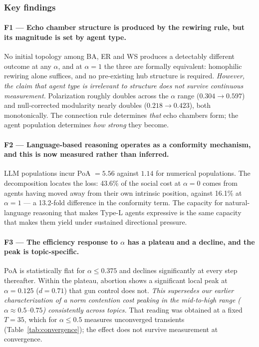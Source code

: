 \subsubsection{Key findings}
\label{sec:res-findings}

\paragraph{F1 --- Echo chamber structure is produced by the rewiring rule, but its
magnitude is set by agent type.}
No initial topology among BA, ER and WS produces a detectably different outcome at any
$\alpha$, and at $\alpha = 1$ the three are formally equivalent: homophilic rewiring
alone suffices, and no pre-existing hub structure is required. \emph{However, the claim
that agent type is irrelevant to structure does not survive continuous measurement.}
Polarization roughly doubles across the $\alpha$ range ($0.304 \to 0.597$) and
null-corrected modularity nearly doubles ($0.218 \to 0.423$), both monotonically. The
connection rule determines \emph{that} echo chambers form; the agent population
determines \emph{how strong} they become.

\paragraph{F2 --- Language-based reasoning operates as a conformity mechanism, and this
is now measured rather than inferred.}
LLM populations incur PoA $= 5.56$ against $1.14$ for numerical populations. The
decomposition locates the loss: 43.6\% of the social cost at $\alpha = 0$ comes from
agents having moved away from their own intrinsic position, against 16.1\% at
$\alpha = 1$ --- a 13.2-fold difference in the conformity term. The capacity for
natural-language reasoning that makes Type-L agents expressive is the same capacity that
makes them yield under sustained directional pressure.

\paragraph{F3 --- The efficiency response to $\alpha$ has a plateau and a decline, and
the peak is topic-specific.}
PoA is statistically flat for $\alpha \le 0.375$ and declines significantly at every step
thereafter. Within the plateau, abortion shows a significant local peak at
$\alpha = 0.125$ ($d = 0.71$) that gun control does not. \emph{This supersedes our earlier
characterization of a norm contention cost peaking in the mid-to-high range
($\alpha \approx 0.5$--$0.75$) consistently across topics.} That reading was obtained at a
fixed $T = 35$, which for $\alpha \le 0.5$ measures unconverged transients
(Table~\ref{tab:convergence}); the effect does not survive measurement at convergence.

